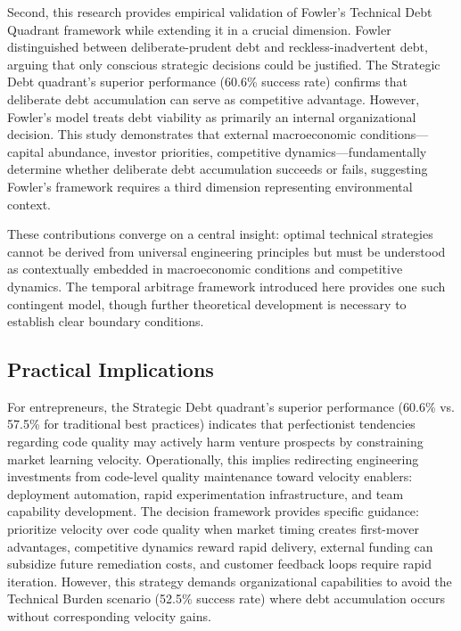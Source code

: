 Second, this research provides empirical validation of Fowler's Technical Debt Quadrant framework \citep{fowler2009technical} while extending it in a crucial dimension. Fowler distinguished between deliberate-prudent debt and reckless-inadvertent debt, arguing that only conscious strategic decisions could be justified. The Strategic Debt quadrant's superior performance (60.6\% success rate) confirms that deliberate debt accumulation can serve as competitive advantage. However, Fowler's model treats debt viability as primarily an internal organizational decision. This study demonstrates that external macroeconomic conditions—capital abundance, investor priorities, competitive dynamics—fundamentally determine whether deliberate debt accumulation succeeds or fails, suggesting Fowler's framework requires a third dimension representing environmental context.

These contributions converge on a central insight: optimal technical strategies cannot be derived from universal engineering principles but must be understood as contextually embedded in macroeconomic conditions and competitive dynamics. The temporal arbitrage framework introduced here provides one such contingent model, though further theoretical development is necessary to establish clear boundary conditions.

\subsection{Practical Implications}

For entrepreneurs, the Strategic Debt quadrant's superior performance (60.6\% vs. 57.5\% for traditional best practices) indicates that perfectionist tendencies regarding code quality may actively harm venture prospects by constraining market learning velocity. Operationally, this implies redirecting engineering investments from code-level quality maintenance toward velocity enablers: deployment automation, rapid experimentation infrastructure, and team capability development. The decision framework provides specific guidance: prioritize velocity over code quality when market timing creates first-mover advantages, competitive dynamics reward rapid delivery, external funding can subsidize future remediation costs, and customer feedback loops require rapid iteration. However, this strategy demands organizational capabilities to avoid the Technical Burden scenario (52.5\% success rate) where debt accumulation occurs without corresponding velocity gains.

